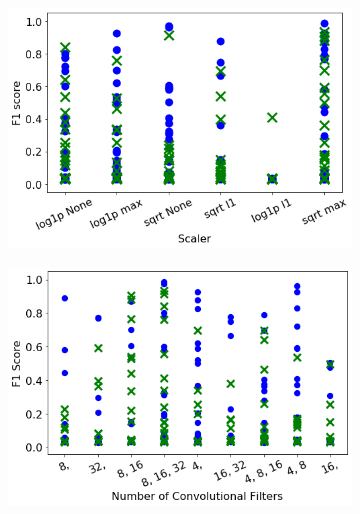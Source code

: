\begin{figure} \ContinuedFloat
    \centering
    
    \begin{subfigure}[t]{0.49\textwidth}
        \centering
        \includegraphics[width=\textwidth]{images/cnn_scaler.png}
        \caption{}
        \label{fig:cnn_scaler}
    \end{subfigure}
    \hfill
    \begin{subfigure}[t]{0.49\textwidth}
        \centering
        \includegraphics[width=\textwidth]{images/cnn_filter_structure.png}
        \caption{}
        \label{fig:cnn_filter_structure}
    \end{subfigure}
    

\end{figure}
